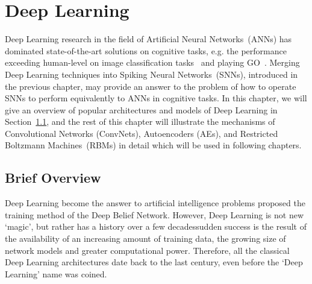 \chapter{Deep Learning}
\label{cha:dnn}
Deep Learning research in the field of Artificial Neural Networks~(ANNs) has dominated state-of-the-art solutions on cognitive tasks, e.g. the performance exceeding human-level  on image classification tasks~\citep{he2015delving} and playing GO~\citep{silver2016mastering}.
Merging Deep Learning techniques into Spiking Neural Networks~(SNNs), introduced in the previous chapter, may provide an answer to the problem of how to operate SNNs to perform equivalently to ANNs in cognitive tasks. 
In this chapter, we will give an overview of popular architectures and models of Deep Learning in Section~\ref{sec:dl_history}, and the rest of this chapter will illustrate the mechanisms of Convolutional Networks (ConvNets), Autoencoders (AEs), and Restricted Boltzmann Machines~(RBMs) in detail which will be used in following chapters.

\section{Brief Overview}
\label{sec:dl_history}
Deep Learning \DIFdelbegin {}\DIFdelend \DIFaddbegin {}\DIFaddend become the answer to \DIFdelbegin {}\DIFdelend \DIFaddbegin {}\DIFaddend artificial intelligence problems \DIFdelbegin {}\DIFdelend \DIFaddbegin {}\DIFaddend proposed the training method of \DIFdelbegin {}\DIFdelend the Deep Belief Network\DIFdelbegin {}\DIFdelend .
However, Deep Learning is not new `magic', but rather has a history over a few decades\DIFdelbegin {}\DIFdelend \DIFaddbegin {}\DIFaddend sudden success is the result of the availability of an increasing amount of training data, the growing size of network models and greater computational power.
Therefore, all the classical Deep Learning architectures date back to the last century, even before the `Deep Learning' name was coined.
\DIFaddbegin {}\DIFaddend %


